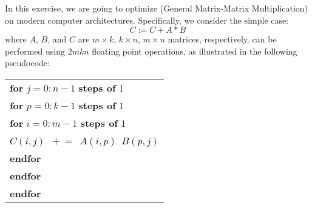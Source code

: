 In this exercise, we are going to optimize \Gemm{} (General Matrix-Matrix
Multiplication) on modern computer architectures.
Specifically, we consider the simple case:
$$C:=C+A*B$$
where $A$, $B$, and $C$ are $m\times k$, $k\times n$, $m\times n$  matrices,
respectively. \Gemm{} can be performed using $2mkn$ floating point operations, as illustrated in the following pseudocode:


\begin{tabular}{l@{}}
{\bf for} $j\!=\! 0:n\!-\!1$ {\bf steps of} $1$ \\
 \hspace{2ex}  {\bf for} $p \!=\! 0:k\!-\!1$ {\bf steps of} $1$ \\
 \hspace{4ex}           {\bf for} $i \!=\! 0:m\!-\!1$ {\bf steps of} $1$ \\
\hspace{6ex}             \textcolor{black}{$C(i,j)$}~$\mathrel{\!+\!}=$~\textcolor{black}{$A(i,p)$}~\textcolor{black}{$B(p,j)$} \\
\hspace{4ex} {\bf endfor}\\
\hspace{2ex} {\bf endfor}\\ 
{\bf endfor}\\ 
\end{tabular}


